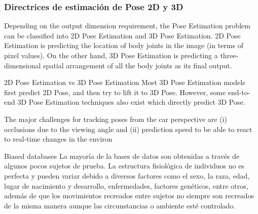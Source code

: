 \subsubsection{Directrices de estimación de Pose 2D y 3D}



Depending on the output dimension requirement, the Pose Estimation problem can be classified into
2D Pose Estimation and 3D Pose Estimation. 2D Pose Estimation is predicting the location of body
joints in the image (in terms of pixel values). On the other hand, 3D Pose Estimation is predicting
a three-dimensional spatial arrangement of all the body joints as its final output.

2D Pose Estimation vs 3D Pose Estimation
Most 3D Pose Estimation models first predict 2D Pose, and then try to lift it to 3D Pose. However,
some end-to-end 3D Pose Estimation techniques also exist which directly predict 3D Pose.


The major challenges for tracking poses from the car perspective are
(i) occlusions due to the viewing angle and (ii) prediction
speed to be able to react to real-time changes in the environ

Biased databases
La mayoría de la bases de datos son obtenidas a través de algunos pocos sujetos de prueba.
La estructura fisiológica de individuos no es perfecta y pueden variar debido a diversos factores
como el sexo, la raza, edad, lugar de nacimiento y desarrollo, enfermedades, factores genéticos, entre
otros, además de que los movimientos recreados entre sujetos no siempre son recreados de la misma manera
aunque las circunstancias o ambiente esté controlado.

